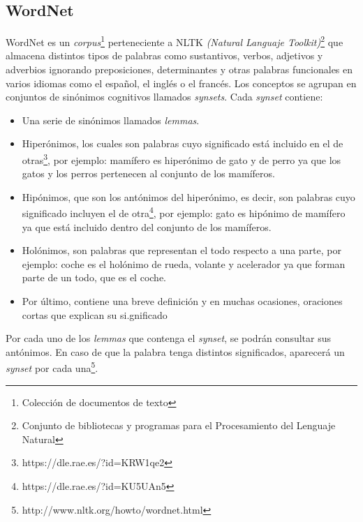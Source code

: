 \subsection{WordNet}
\label{cap:subsec:wordnet}
WordNet es un \textit{corpus}\footnote{Colección de documentos de texto} perteneciente a NLTK \textit{(Natural Languaje Toolkit)}\footnote{Conjunto de bibliotecas y programas para el Procesamiento del Lenguaje Natural} que almacena distintos tipos de palabras como sustantivos, verbos, adjetivos y adverbios ignorando preposiciones, determinantes y otras palabras funcionales en varios idiomas como el español, el inglés o el francés. Los conceptos se agrupan en conjuntos de sinónimos cognitivos llamados \textit{synsets}. Cada \textit{synset} contiene:
\begin{itemize}
	\item Una serie de sinónimos llamados \textit{lemmas}.
	\item Hiperónimos, los cuales son palabras cuyo significado está incluido en el de otras\footnote{https://dle.rae.es/?id=KRW1qe2}, por ejemplo: mamífero es hiperónimo de gato y de perro ya que los gatos y los perros pertenecen al conjunto de los mamíferos.
	\item Hipónimos, que son los antónimos del hiperónimo, es decir, son palabras cuyo significado incluyen el de otra\footnote{https://dle.rae.es/?id=KU5UAn5}, por ejemplo: gato es hipónimo de mamífero ya que está incluido dentro del conjunto de los mamíferos.
	\item Holónimos, son palabras que representan el todo respecto a una parte, por ejemplo: coche es el holónimo de rueda, volante y acelerador ya que forman parte de un todo, que es el coche.
	\item Por último, contiene una breve definición y en muchas ocasiones, oraciones cortas que explican su si.gnificado			
\end{itemize} 
Por cada uno de los \textit{lemmas} que contenga el \textit{synset}, se podrán consultar sus antónimos. En caso de que la palabra tenga distintos significados, aparecerá un \textit{synset} por cada una\footnote{http://www.nltk.org/howto/wordnet.html}.
	




